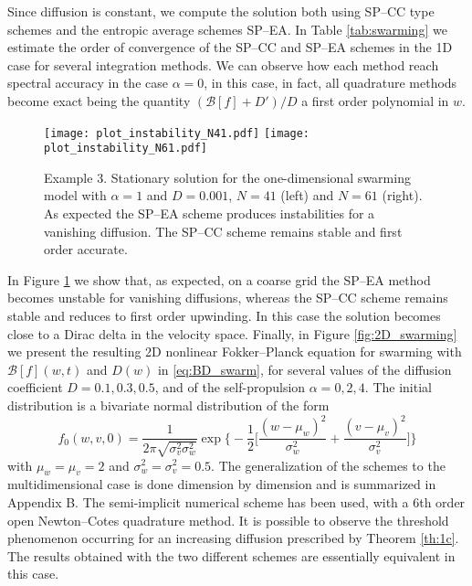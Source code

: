\documentclass[a4paper]{article}
\theoremstyle{remark}\newtheorem{remark}{Remark}
\newcommand{\B}{\mathcal{B}}
\begin{document}
Since diffusion is constant, we compute the solution both using SP--CC type schemes and the entropic average schemes SP--EA. 
In Table \ref{tab:swarming} we estimate the order of convergence of the SP--CC and SP--EA schemes in the 1D case for several integration methods. We can observe how each method reach spectral accuracy in the case $\alpha=0$, in this case, in fact, all quadrature methods become exact being  the quantity $(\B[f]+D')/D$ a first order polynomial in $w$.

\begin{figure}
\centering
\texttt{[image: plot\_instability\_N41.pdf]}
\texttt{[image: plot\_instability\_N61.pdf]}
\caption{{Example 3}. Stationary solution for the one-dimensional swarming model with $\alpha=1$ and $D=0.001$, $N=41$ (left) and $N=61$ (right). As expected the SP--EA scheme produces instabilities for a vanishing diffusion. The SP--CC scheme remains stable and first order accurate. }\label{fig:instability}
\end{figure}


In Figure \ref{fig:instability} we show that, as expected, on a coarse grid the SP--EA method becomes unstable for vanishing diffusions, whereas the SP--CC scheme remains stable and reduces to first order upwinding. In this case the solution becomes close to a Dirac delta in the velocity space. 
Finally, in Figure \ref{fig:2D_swarming} we present the resulting 2D nonlinear Fokker--Planck equation for swarming with $\B[f](w,t)$ and $D(w)$ in \eqref{eq:BD_swarm}, for several values of the diffusion coefficient $D=0.1,0.3,0.5$, and of the self-propulsion $\alpha=0,2,4$. The initial distribution is a bivariate normal distribution of the form
\[
f_0(w,v,0) = \dfrac{1}{2\pi\sqrt{\sigma^2_v\sigma^2_w}}\exp \Big\{ -\dfrac{1}{2} \Big[ \dfrac{(w-\mu_w)^2}{\sigma_w^2}+\dfrac{(v-\mu_v)^2}{\sigma_v^2} \Big] \Big\}
\] 
with $\mu_w=\mu_v=2$ and $\sigma_w^2=\sigma_v^2=0.5$. The generalization of the schemes to the multidimensional case is done dimension by dimension and is summarized in Appendix B. The semi-implicit numerical scheme has been used, with a $6$th order open Newton--Cotes quadrature method. It is possible to observe the threshold phenomenon occurring for an increasing diffusion prescribed by Theorem \ref{th:1c}. The results obtained with the two different schemes are essentially equivalent in this case.
\end{document}
